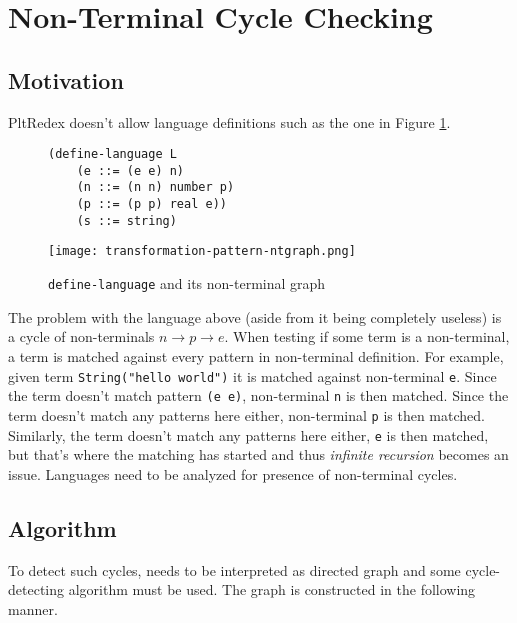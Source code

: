 \section{Non-Terminal Cycle Checking}

\subsection{Motivation}
PltRedex doesn't allow language definitions such as the one in Figure \ref{dl-ntcyclegraph}. 

\begin{figure}[H]
\begin{minipage}{0.45\linewidth}
	\centering
\begin{verbatim}
(define-language L
	(e ::= (e e) n)
	(n ::= (n n) number p)
	(p ::= (p p) real e))
	(s ::= string)
\end{verbatim}
\end{minipage}
\begin{minipage}{0.45\linewidth}
	\centering
	\texttt{[image: transformation-pattern-ntgraph.png]}
\end{minipage}
	\caption{\texttt{define-language} and its non-terminal graph}
	\label{dl-ntcyclegraph}
\end{figure}

The problem with the language above (aside from it being completely useless) is a cycle of non-terminals $n \rightarrow p \rightarrow e$. When testing if some term is a non-terminal, a term is matched against every pattern in non-terminal definition. For example, given term \texttt{String("hello world")} it is matched against non-terminal \texttt{e}. Since  the term doesn't match pattern \texttt{(e e)}, non-terminal \texttt{n} is then matched. Since the term doesn't match any patterns here either, non-terminal \texttt{p} is then matched. Similarly, the term doesn't match any patterns here either, \texttt{e} is then matched, but that's where the matching has started and thus \textit{infinite recursion} becomes an issue. Languages need to be analyzed for presence of non-terminal cycles.

\subsection{Algorithm}
To detect such cycles, \DefineLanguageNoArg needs to be interpreted as directed graph and some cycle-detecting algorithm must be used. The graph is constructed in the following manner.

